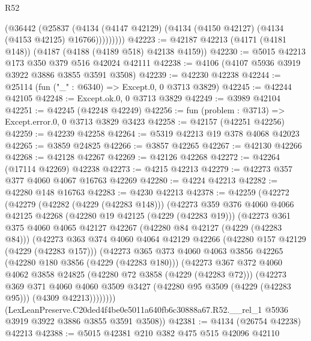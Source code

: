 \begin{lexlean}{R52}
\begin{coremodule}
            (@36442
              (@25837
                (@4134 (@4147 @42129) (@4134 (@4150 @42127) (@4134 (@4153 @42125) @16766)))))))))
@42223 := @42187 @42213 (@4171 (@4181 @148)) (@4187 (@4188 (@4189 @518) @42138 @4159))
@42230 := @5015 @42213 @173 @350 @379 @516 @42024 @42111
@42238 := @4106 (@4107 @5936 @3919 @3922 @3886 @3855 @3591 @3508)
@42239 := @42230 @42238
@42244 := @25114 (fun ("_" : @6340) => Except.{0, 0} @3713 @3829)
@42245 := @42244 @42105
@42248 := Except.ok.{0, 0} @3713 @3829
@42249 := @3989 @42104
@42251 := @42245 (@42248 @42249)
@42256 := fun (problem : @3713) => Except.error.{0, 0} @3713 @3829 @3423
@42258 := @42157 (@42251 @42256)
@42259 := @42239 @42258
@42264 := @5319 @42213 @19 @378 @4068 @42023
@42265 := @3859 @24825
@42266 := @3857 @42265
@42267 := @42130 @42266
@42268 := @42128 @42267
@42269 := @42126 @42268
@42272 := @42264 (@17114 @42269) @42238
@42273 := @4215 @42213
@42279 := @42273 @357 @377 @4060 @4067 @16763 @42269
@42280 := @4224 @42213
@42282 := @42280 @148 @16763
@42283 := @4230 @42213
@42378 := @42259
    (@42272
      (@42279
        (@42282 (@4229 (@42283 @148)))
        (@42273
          @359
          @376
          @4060
          @4066
          @42125
          @42268
          (@42280 @19 @42125 (@4229 (@42283 @19)))
          (@42273
            @361
            @375
            @4060
            @4065
            @42127
            @42267
            (@42280 @84 @42127 (@4229 (@42283 @84)))
            (@42273
              @363
              @374
              @4060
              @4064
              @42129
              @42266
              (@42280 @157 @42129 (@4229 (@42283 @157)))
              (@42273
                @365
                @373
                @4060
                @4063
                @3856
                @42265
                (@42280 @180 @3856 (@4229 (@42283 @180)))
                (@42273
                  @367
                  @372
                  @4060
                  @4062
                  @3858
                  @24825
                  (@42280 @72 @3858 (@4229 (@42283 @72)))
                  (@42273
                    @369
                    @371
                    @4060
                    @4060
                    @3509
                    @3427
                    (@42280 @95 @3509 (@4229 (@42283 @95)))
                    (@4309 @42213))))))))
      (LexLeanPreserve.C20ded4f4be0e5011a640fb6c30888a67.R52.__rel_1
        @5936
        @3919
        @3922
        @3886
        @3855
        @3591
        @3508))
@42381 := @4134 (@26754 @42238) @42213
@42388 := @5015 @42381 @210 @382 @475 @515 @42096 @42110

\end{coremodule}
\end{lexlean}
